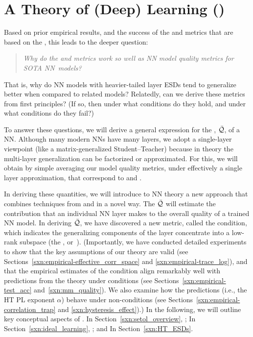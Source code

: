 \section{A \SemiEmpirical Theory of (Deep) Learning (\SETOL)}
\label{sxn:setol}

Based on prior empirical results, and the success of the \ALPHA and \ALPHAHAT metrics that are based on the \HTSR \Phenomenology, this leads to the deeper question: 
%
\begin{quote}
\emph{Why do the \ALPHA and \ALPHAHAT metrics work so well as NN model quality metrics for SOTA NN~models?}
\end{quote}
That is, why do NN models with heavier-tailed layer ESDs tend to generalize better when compared to related models?
Relatedly, can we derive these metrics from first principles?
(If so, then under what conditions do they hold, and under what conditions do they fail?)


\noindent
To answer these questions, we will derive a general expression for the \LayerQuality, $\bar{\mathcal{Q}}$, of a NN.
Although many modern NNs have many layers, we adopt a single-layer viewpoint (like a matrix-generalized Student–Teacher) because in \SMOG theory the multi-layer generalization can be factorized or approximated.
For this, we will obtain by simple averaging our model quality metrics, under effectively a single layer approximation, that correspond to \ALPHA and \ALPHAHAT.


In deriving these quantities, we will introduce to NN theory a new \SemiEmpirical approach that combines techniques from \STATMECH and \RMT in a novel way.
The \LayerQuality $\bar{\mathcal{Q}}$ will estimate the contribution that an individual NN layer makes to the overall quality of a trained NN model.
In deriving $\bar{\mathcal{Q}}$, we have discovered a new \LayerQuality metric, called the \TRACELOG condition,
which indicates the generalizing components of the layer concentrate into a low-rank subspace
(the \emph{\EffectiveCorrelationSpace}, or~\ECS).
%
(Importantly, we have conducted detailed experiments to show that the key assumptions of our \SETOL theory are valid
(see Sections~\ref{sxn:empirical-effective_corr_space} and \ref{sxn:empirical-trace_log}),
and that the empirical estimates of the \SETOL \TRACELOG condition align remarkably well with predictions from the \HTSR
theory under \Ideal conditions (see Sections~\ref{sxn:empirical-test_acc} and~\ref{sxn:mm_quality}).
We also examine how the \HTSR predictions (i.e., the HT PL exponent $\alpha$) behave under non-\Ideal conditions (see Sections~\ref{sxn:empirical-correlation_trap} and \ref{sxn:hysteresis_effect}).)
%
In the following, we will outline key conceptual aspects of \SETOL.
In Section~\ref{sxn:setol_overview}, ;
In Section~\ref{sxn:ideal_learning}, ; and
In Section~\ref{sxn:HT_ESDs}.







